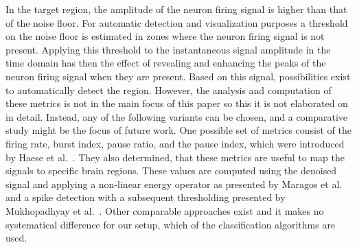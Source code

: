 \documentclass[journal]{vgtc}                %
\begin{document}
In the target region, the amplitude of the neuron firing signal is higher than that of the noise floor. For automatic detection and visualization purposes a threshold on the noise floor is estimated in zones where the neuron firing signal is not present. Applying this threshold to the instantaneous signal amplitude in the time domain has then the effect of revealing and enhancing the peaks of the neuron firing signal when they are present. Based on this signal, possibilities exist to automatically detect the region. However, the analysis and computation of these metrics is not in the main focus of this paper so this it is not elaborated on in detail. Instead, any of the following variants can be chosen, and a comparative study might be the focus of future work. One possible set of metrics consist of the firing rate, burst index, pause ratio, and the pause index, which were introduced by Haese et al.~\cite{Haese2005}. They also determined, that these metrics are useful to map the signals to specific brain regions. These values are computed using the denoised signal and applying a non-linear energy operator as presented by Maragos et al.~\cite{Maragos1993} and a spike detection with a subsequent thresholding presented by Mukhopadhyay et al.~\cite{Mukhopadhyay1998}. Other comparable approaches exist and it makes no systematical difference for our setup, which of the classification algorithms are used.
\end{document}
